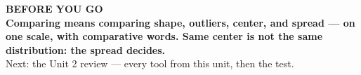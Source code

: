 \documentclass[aspectratio=169, 11pt]{beamer}
\begin{document}
{
\begin{frame}[plain]
  \vspace{1.5cm}\hspace{0.8cm}%
  \begin{minipage}{0.86\textwidth}
    {\color{goldacc}\bfseries\small BEFORE YOU GO}\\[0.7cm]
    {\color{white}\bfseries\Large Comparing means comparing shape, outliers, center, and
    spread --- on one scale, with comparative words. Same center is not the same
    distribution: the spread decides.}\\[0.9cm]
    {\color{frostmid}\small Next: the Unit 2 review --- every tool from this unit, then the
    test.}
  \end{minipage}
\end{frame}
}
\end{document}
